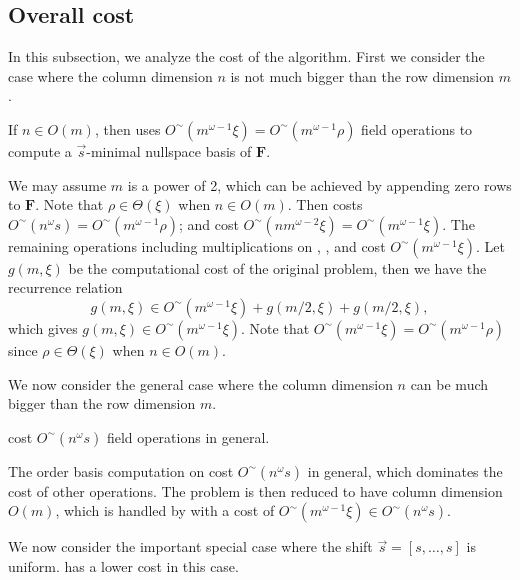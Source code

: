 \subsection{Overall cost}

In this subsection, we analyze the cost of the algorithm. First we
consider the case where the column dimension $n$ is not much bigger
than the row dimension $m$. 
\begin{lem}
\label{lem:costLowColDimension}If $n\in O\left(m\right)$, then 
uses $O^{\sim}\left(m^{\omega-1}\xi\right)=O^{\sim}\left(m^{\omega-1}\rho\right)$
field operations to compute a $\vec{s}$-minimal nullspace basis of
$\mathbf{F}$.\end{lem}
\begin{pf}
We may assume $m$ is a power of 2, which can be achieved by appending
zero rows to $\mathbf{F}$. Note that $\rho\in\Theta\left(\xi\right)$
when $n\in O\left(m\right)$. Then  costs
$O^{\sim}\left(n^{\omega}s\right)=O^{\sim}\left(m^{\omega-1}\rho\right)$;
 and cost
$O^{\sim}\left(nm^{\omega-2}\xi\right)=O^{\sim}\left(m^{\omega-1}\xi\right)$.
The remaining operations including multiplications on ,
, and 
cost $O^{\sim}\left(m^{\omega-1}\xi\right)$. Let $g(m,\xi)$ be the
computational cost of the original problem, then we have the recurrence
relation 
\[
g(m,\xi)\in O^{\sim}(m^{\omega-1}\xi)+g(m/2,\xi)+g(m/2,\xi),
\]
 which gives $g(m,\xi)\in O^{\sim}(m^{\omega-1}\xi)$. Note that $O^{\sim}\left(m^{\omega-1}\xi\right)=O^{\sim}\left(m^{\omega-1}\rho\right)$
since $\rho\in\Theta\left(\xi\right)$ when $n\in O\left(m\right)$.
\end{pf}
We now consider the general case where the column dimension $n$ can
be much bigger than the row dimension $m$.
\begin{lem}
\label{lem:costGeneral} cost
$O^{\sim}\left(n^{\omega}s\right)$ field operations in general.\end{lem}
\begin{pf}
The order basis computation on  cost $O^{\sim}\left(n^{\omega}s\right)$
in general, which dominates the cost of other operations. The problem
is then reduced to have column dimension $O\left(m\right)$, which
is handled by  with a cost of
$O^{\sim}\left(m^{\omega-1}\xi\right)\in O^{\sim}\left(n^{\omega}s\right)$.
\end{pf}
We now consider the important special case where the shift $\vec{s}=\left[s,\dots,s\right]$
is uniform.  has a lower cost
in this case.

